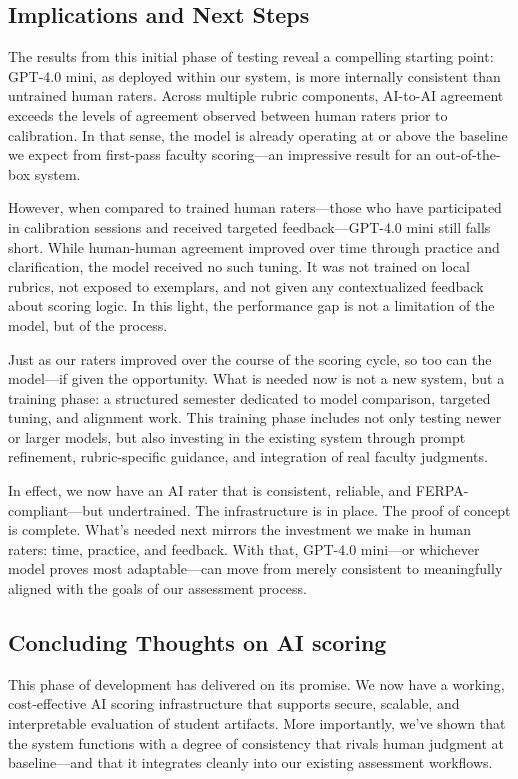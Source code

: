 \documentclass[12pt]{article}%
\begin{document}
\subsection*{Implications and Next Steps}

The results from this initial phase of testing reveal a compelling starting point: GPT-4.0 mini, as deployed within our system, is more internally consistent than untrained human raters. Across multiple rubric components, AI-to-AI agreement exceeds the levels of agreement observed between human raters prior to calibration. In that sense, the model is already operating at or above the baseline we expect from first-pass faculty scoring—an impressive result for an out-of-the-box system.

However, when compared to trained human raters—those who have participated in calibration sessions and received targeted feedback—GPT-4.0 mini still falls short. While human-human agreement improved over time through practice and clarification, the model received no such tuning. It was not trained on local rubrics, not exposed to exemplars, and not given any contextualized feedback about scoring logic. In this light, the performance gap is not a limitation of the model, but of the process.

Just as our raters improved over the course of the scoring cycle, so too can the model—if given the opportunity. What is needed now is not a new system, but a training phase: a structured semester dedicated to model comparison, targeted tuning, and alignment work. This training phase includes not only testing newer or larger models, but also investing in the existing system through prompt refinement, rubric-specific guidance, and integration of real faculty judgments. 

In effect, we now have an AI rater that is consistent, reliable, and FERPA-compliant—but undertrained. The infrastructure is in place. The proof of concept is complete. What’s needed next mirrors the investment we make in human raters: time, practice, and feedback. With that, GPT-4.0 mini—or whichever model proves most adaptable—can move from merely consistent to meaningfully aligned with the goals of our assessment process.

\subsection*{Concluding Thoughts on AI scoring}

This phase of development has delivered on its promise. We now have a working, cost-effective AI scoring infrastructure that supports secure, scalable, and interpretable evaluation of student artifacts. More importantly, we’ve shown that the system functions with a degree of consistency that rivals human judgment at baseline—and that it integrates cleanly into our existing assessment workflows.
\end{document}
